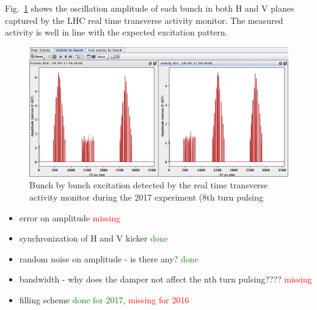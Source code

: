 \documentclass[%
 reprint,
 amsmath,amssymb,
 aps,
prstab,
]{revtex4-1}
\begin{document}
Fig.~\ref{fig:fill_meas} shows the oscillation amplitude of each bunch in both H and V planes captured by the LHC real time transverse activity monitor. The measured activity is well in line with the expected excitation pattern.
\begin{figure}
	\centering
	\includegraphics[width=1.0\linewidth]{bunchfilling_measured.png}	
	\caption{\label{fig:fill_meas} Bunch by bunch excitation detected by the real time transverse activity monitor during the 2017 experiment (8th turn pulsing}
\end{figure}

\begin{itemize}
	\item error on amplitude \textcolor{red}{missing}
	\item synchronization of H and V kicker \textcolor{green}{done}
	\item random noise on amplitude - is there any? \textcolor{green}{done}
	\item bandwidth - why does the damper not affect the nth turn pulsing???? \textcolor{red}{missing}
	\item filling scheme \textcolor{green}{done for 2017}, \textcolor{red}{missing for 2016}
\end{itemize}
\end{document}
